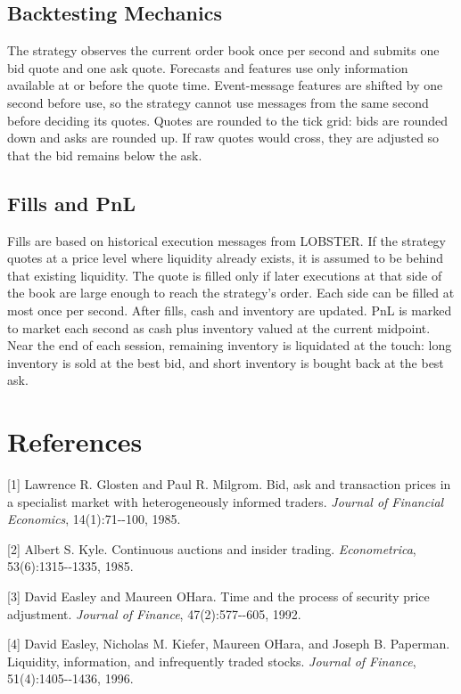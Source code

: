 \documentclass[12pt,a4paper]{article}
\let\originalsection\section
\renewcommand{\section}{\clearpage\originalsection}
\begin{document}
\subsection{Backtesting Mechanics}\label{backtesting-mechanics}

The strategy observes the current order book once per second and submits
one bid quote and one ask quote. Forecasts and features use only
information available at or before the quote time. Event-message features
are shifted by one second before use, so the strategy cannot use messages
from the same second before deciding its quotes. Quotes are rounded to
the tick grid: bids are rounded down and asks are rounded up. If raw
quotes would cross, they are adjusted so that the bid remains below the
ask.

\subsection{Fills and PnL}\label{fills-and-pnl}

Fills are based on historical execution messages from LOBSTER. If the
strategy quotes at a price level where liquidity already exists, it is
assumed to be behind that existing liquidity. The quote is filled only if
later executions at that side of the book are large enough to reach the
strategy's order. Each side can be filled at most once per second. After
fills, cash and inventory are updated. PnL is marked to market each
second as cash plus inventory valued at the current midpoint. Near the
end of each session, remaining inventory is liquidated at the touch:
long inventory is sold at the best bid, and short inventory is bought
back at the best ask.

\endgroup

\originalsection{References}\label{references}

{[}1{]} Lawrence R. Glosten and Paul R. Milgrom. Bid, ask and
transaction prices in a specialist market with heterogeneously informed
traders. \emph{Journal of Financial Economics}, 14(1):71-\/-100, 1985.

{[}2{]} Albert S. Kyle. Continuous auctions and insider trading.
\emph{Econometrica}, 53(6):1315-\/-1335, 1985.

{[}3{]} David Easley and Maureen O\textquotesingle Hara. Time and the
process of security price adjustment. \emph{Journal of Finance},
47(2):577-\/-605, 1992.

{[}4{]} David Easley, Nicholas M. Kiefer, Maureen
O\textquotesingle Hara, and Joseph B. Paperman. Liquidity, information,
and infrequently traded stocks. \emph{Journal of Finance},
51(4):1405-\/-1436, 1996.
\end{document}
